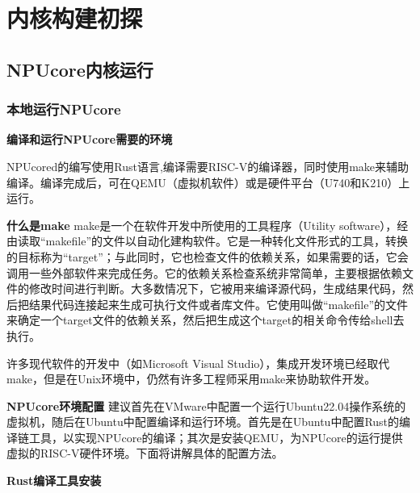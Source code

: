 \chapter{内核构建初探}
\section{NPUcore内核运行}
\subsection{本地运行NPUcore}
\textbf{编译和运行NPUcore需要的环境}

NPUcored的编写使用Rust语言,编译需要RISC-V的编译器，同时使用make来辅助编译。编译完成后，可在QEMU（虚拟机软件）或是硬件平台（U740和K210）上运行。

\textbf{什么是make}
make是一个在软件开发中所使用的工具程序（Utility software），经由读取“makefile”的文件以自动化建构软件。它是一种转化文件形式的工具，转换的目标称为“target”；与此同时，它也检查文件的依赖关系，如果需要的话，它会调用一些外部软件来完成任务。它的依赖关系检查系统非常简单，主要根据依赖文件的修改时间进行判断。大多数情况下，它被用来编译源代码，生成结果代码，然后把结果代码连接起来生成可执行文件或者库文件。它使用叫做“makefile”的文件来确定一个target文件的依赖关系，然后把生成这个target的相关命令传给shell去执行。

许多现代软件的开发中（如Microsoft Visual Studio），集成开发环境已经取代make，但是在Unix环境中，仍然有许多工程师采用make来协助软件开发。

\textbf{NPUcore环境配置}
建议首先在VMware中配置一个运行Ubuntu22.04操作系统的虚拟机，随后在Ubuntu中配置编译和运行环境。首先是在Ubuntu中配置Rust的编译链工具，以实现NPUcore的编译；其次是安装QEMU，为NPUcore的运行提供虚拟的RISC-V硬件环境。下面将讲解具体的配置方法。

\textbf{Rust编译工具安装}

